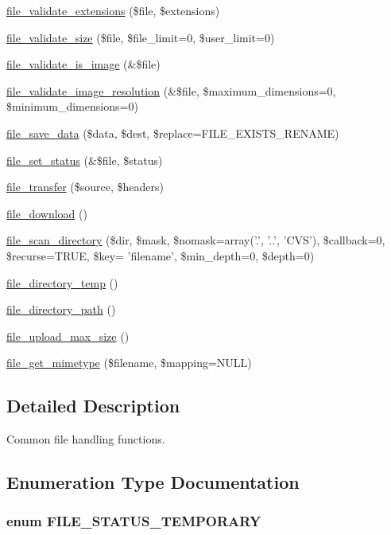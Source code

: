 \begin{CompactItemize}
\item 
\hyperlink{group__file_g7f9c8080c156bba75bf4ad9812378a2c}{file\_\-validate\_\-extensions} (\$file, \$extensions)
\item 
\hyperlink{group__file_g69120c7a4e953069673539c6710575f4}{file\_\-validate\_\-size} (\$file, \$file\_\-limit=0, \$user\_\-limit=0)
\item 
\hyperlink{group__file_gbabb21f40d60d2cbd21953d0935abdb7}{file\_\-validate\_\-is\_\-image} (\&\$file)
\item 
\hyperlink{group__file_gb6e58a5341acf0be4c030887836f75f6}{file\_\-validate\_\-image\_\-resolution} (\&\$file, \$maximum\_\-dimensions=0, \$minimum\_\-dimensions=0)
\item 
\hyperlink{group__file_g0c3dd2f6c8734744740fd1f00f84c719}{file\_\-save\_\-data} (\$data, \$dest, \$replace=FILE\_\-EXISTS\_\-RENAME)
\item 
\hyperlink{group__file_g68a0e6728e47cf2f9d543a0002ff3f49}{file\_\-set\_\-status} (\&\$file, \$status)
\item 
\hyperlink{group__file_g33925d82d6b6057e73ae7853f1be7125}{file\_\-transfer} (\$source, \$headers)
\item 
\hyperlink{group__file_g91226299fab7e95a673f6461bbc19b02}{file\_\-download} ()
\item 
\hyperlink{group__file_g374c73d3fe4f45c2d64a5fb0b22cb118}{file\_\-scan\_\-directory} (\$dir, \$mask, \$nomask=array('.', '..', 'CVS'), \$callback=0, \$recurse=TRUE, \$key= 'filename', \$min\_\-depth=0, \$depth=0)
\item 
\hyperlink{group__file_g250e5cfba54030ab1e5f031608860e42}{file\_\-directory\_\-temp} ()
\item 
\hyperlink{group__file_gd516f499a62a2e22f95f4969262cd617}{file\_\-directory\_\-path} ()
\item 
\hyperlink{group__file_g7cf25e6a2532a1d022ee1c655f895380}{file\_\-upload\_\-max\_\-size} ()
\item 
\hyperlink{group__file_g27868c5159f7f001457c284123fe9311}{file\_\-get\_\-mimetype} (\$filename, \$mapping=NULL)
\end{CompactItemize}


\subsection{Detailed Description}
Common file handling functions. 

\subsection{Enumeration Type Documentation}
\hypertarget{group__file_g436af683744d1fefcd6da3d694633d19}{
\subsubsection[{FILE\_\-STATUS\_\-TEMPORARY}]{\setlength{\rightskip}{0pt plus 5cm}enum {\bf FILE\_\-STATUS\_\-TEMPORARY}}}
\label{group__file_g436af683744d1fefcd6da3d694633d19}


